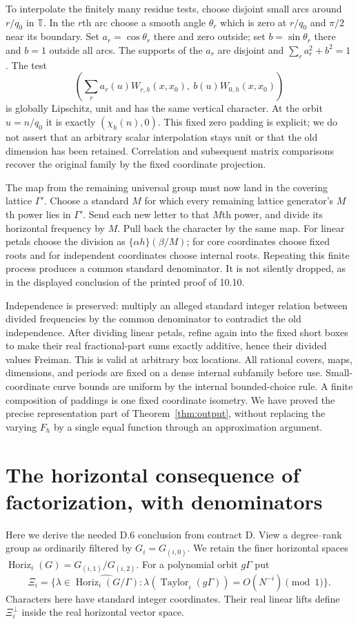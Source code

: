 \documentclass[11pt]{article}
\newcommand{\T}{\mathbb T}\newcommand{\N}{\mathbb N}
\newcommand{\Hor}{\operatorname{Horiz}}\newcommand{\Tay}{\operatorname{Taylor}}
\begin{document}
To interpolate the finitely many residue tests, choose disjoint small arcs
around $r/q_0$ in $\T$. In the $r$th arc choose a smooth angle $\theta_r$
which is zero at $r/q_0$ and $\pi/2$ near its boundary. Set $a_r=\cos\theta_r$
there and zero outside; set $b=\sin\theta_r$ there and $b=1$ outside all
arcs. The supports of the $a_r$ are disjoint and $\sum_r a_r^2+b^2=1$.
The test
\[
 \left(\sum_r a_r(u)W_{r,h}(x,x_0),\ b(u)W_{0,h}(x,x_0)\right)
\]
is globally Lipschitz, unit and has the same vertical character. At the orbit
$u=n/q_0$ it is exactly $(\chi_h(n),0)$. This fixed zero padding is explicit;
we do not assert that an arbitrary scalar interpolation stays unit or that
the old dimension has been retained. Correlation and subsequent matrix
comparisons recover the original family by the fixed coordinate projection.

The map from the remaining universal group must now land in the covering
lattice $\Gamma'$. Choose a standard $M$ for which every remaining lattice
generator's $M$th power lies in $\Gamma'$. Send each new letter to that
$M$th power, and divide its horizontal frequency by $M$. Pull back the
character by the same map. For linear petals choose the division as
$\{\alpha h\}(\beta/M)$; for core coordinates choose fixed roots and for
independent coordinates choose internal roots. Repeating this finite process
produces a common standard denominator. It is not silently dropped, as in
the displayed conclusion of the printed proof of 10.10.

Independence is preserved: multiply an alleged standard integer relation
between divided frequencies by the common denominator to contradict the
old independence. After dividing linear petals, refine again into the fixed
short boxes to make their real fractional-part sums exactly additive, hence
their divided values Freiman. This is valid at arbitrary box locations.
All rational covers, maps, dimensions, and periods are fixed on a dense
internal subfamily before use. Small-coordinate curve bounds are uniform
by the internal bounded-choice rule. A finite composition of paddings is
one fixed coordinate isometry. We have proved the precise representation
part of Theorem~\ref{thm:output}, without replacing the varying $F_h$ by a
single equal function through an approximation argument.

\section{The horizontal consequence of factorization, with denominators}
Here we derive the needed D.6 conclusion from contract D. View a degree--rank
group as ordinarily filtered by $G_i=G_{(i,0)}$. We retain the finer horizontal
spaces $\Hor_i(G)=G_{(i,1)}/G_{(i,2)}$. For a polynomial orbit $g\Gamma$ put
\[
 \Xi_i=\{\lambda\in\widehat{\Hor_i(G/\Gamma)}:
                 \lambda(\Tay_i(g\Gamma))=O(N^{-i})\pmod1\}.
\]
Characters here have standard integer coordinates. Their real linear lifts
define $\Xi_i^\perp$ inside the real horizontal vector space.
\end{document}
